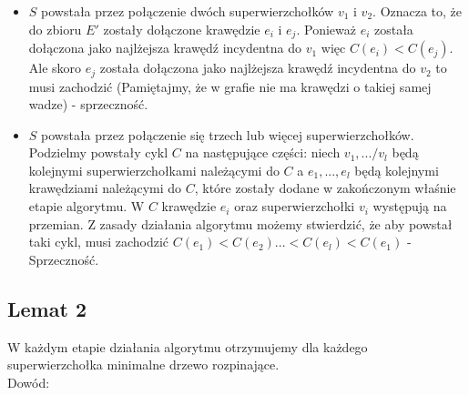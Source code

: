 \documentclass[svgnames]{report}
\begin{document}
\begin{itemize}
\item $S$ powstała przez połączenie dwóch superwierzchołków $v_1$ i $v_2$. Oznacza to, że do zbioru $E'$ zostały dołączone krawędzie $e_i$ i $e_j$. Ponieważ $e_i$ została dołączona jako najlżejsza krawędź incydentna do $v_1$ więc $C(e_i) < C(e_j)$. Ale skoro $e_j$ została dołączona jako najlżejsza krawędź incydentna do $v_2$ to musi zachodzić  (Pamiętajmy, że w grafie nie ma krawędzi o takiej samej wadze) - sprzeczność.

\item $S$ powstała przez połączenie się trzech lub więcej superwierzchołków. Podzielmy powstały cykl $C$ na następujące części: niech $v_1,.../v_l$ będą kolejnymi superwierzchołkami należącymi do $C$ a $e_1,...,e_l$ będą kolejnymi krawędziami należącymi do $C$, które zostały dodane w zakończonym właśnie etapie algorytmu. W $C$ krawędzie $e_i$ oraz superwierzchołki $v_i$ występują na przemian. Z zasady działania algorytmu możemy stwierdzić, że aby powstał taki cykl, musi zachodzić $C(e_1) < C(e_2) ... < C(e_l) < C(e_1)$ - Sprzeczność.
\end{itemize}

\subsection{Lemat 2}

\noindent W każdym etapie działania algorytmu otrzymujemy dla każdego superwierzchołka minimalne drzewo rozpinające.\\

\noindent Dowód:
\end{document}
